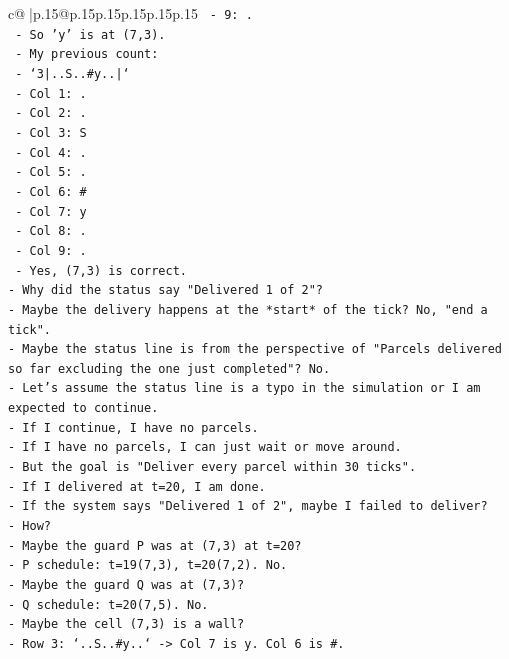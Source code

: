 \documentclass{article}
\begin{document}
{\begin{supertabular}{c@{$\;$}|p{.15\linewidth}@{}p{.15\linewidth}p{.15\linewidth}p{.15\linewidth}p{.15\linewidth}p{.15\linewidth}}
{{{\texttt{  {-} 9: .} \\
\texttt{  {-} So 'y' is at (7,3).} \\
\texttt{  {-} My previous count:} \\
\texttt{    {-} `3|..S..\#y..|`} \\
\texttt{    {-} Col 1: .} \\
\texttt{    {-} Col 2: .} \\
\texttt{    {-} Col 3: S} \\
\texttt{    {-} Col 4: .} \\
\texttt{    {-} Col 5: .} \\
\texttt{    {-} Col 6: \#} \\
\texttt{    {-} Col 7: y} \\
\texttt{    {-} Col 8: .} \\
\texttt{    {-} Col 9: .} \\
\texttt{  {-} Yes, (7,3) is correct.} \\
\texttt{{-} Why did the status say "Delivered 1 of 2"?} \\
\texttt{{-} Maybe the delivery happens at the *start* of the tick? No, "end a tick".} \\
\texttt{{-} Maybe the status line is from the perspective of "Parcels delivered so far excluding the one just completed"? No.} \\
\texttt{{-} Let's assume the status line is a typo in the simulation or I am expected to continue.} \\
\texttt{{-} If I continue, I have no parcels.} \\
\texttt{{-} If I have no parcels, I can just wait or move around.} \\
\texttt{{-} But the goal is "Deliver every parcel within 30 ticks".} \\
\texttt{{-} If I delivered at t=20, I am done.} \\
\texttt{{-} If the system says "Delivered 1 of 2", maybe I failed to deliver?} \\
\texttt{{-} How?} \\
\texttt{{-} Maybe the guard P was at (7,3) at t=20?} \\
\texttt{{-} P schedule: t=19(7,3), t=20(7,2). No.} \\
\texttt{{-} Maybe the guard Q was at (7,3)?} \\
\texttt{{-} Q schedule: t=20(7,5). No.} \\
\texttt{{-} Maybe the cell (7,3) is a wall?} \\
\texttt{{-} Row 3: `..S..\#y..` {-}> Col 7 is y. Col 6 is \#.} \\
}}}
\end{supertabular}}
\end{document}
